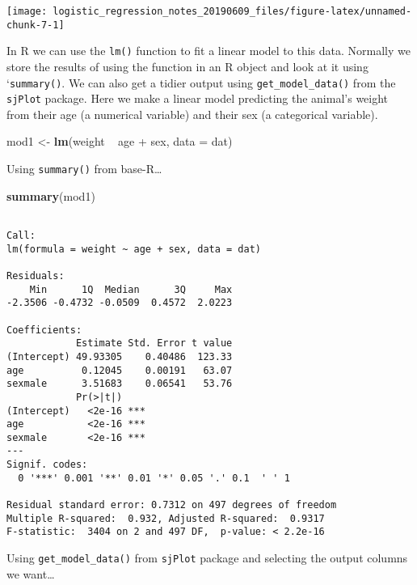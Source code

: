 \documentclass[]{tufte-handout}
\newenvironment{Shaded}{}{}
\newcommand{\DataTypeTok}[1]{\textcolor[rgb]{0.56,0.13,0.00}{#1}}
\newcommand{\KeywordTok}[1]{\textcolor[rgb]{0.00,0.44,0.13}{\textbf{#1}}}
\newcommand{\NormalTok}[1]{#1}
\newcommand{\OperatorTok}[1]{\textcolor[rgb]{0.40,0.40,0.40}{#1}}
\newcommand{\StringTok}[1]{\textcolor[rgb]{0.25,0.44,0.63}{#1}}
\begin{document}
\texttt{[image: logistic\_regression\_notes\_20190609\_files/figure-latex/unnamed-chunk-7-1]}

In R we can use the \texttt{lm()} function to fit a linear model to this
data. Normally we store the results of using the function in an R object
and look at it using `\texttt{summary()}. We can also get a tidier
output using \texttt{get\_model\_data()} from the \texttt{sjPlot}
package. Here we make a linear model predicting the animal's weight from
their age (a numerical variable) and their sex (a categorical variable).

\begin{Shaded}
\begin{Highlighting}[]
\NormalTok{mod1 <-}\StringTok{ }\KeywordTok{lm}\NormalTok{(weight }\OperatorTok{~}\StringTok{ }\NormalTok{age }\OperatorTok{+}\StringTok{ }\NormalTok{sex, }\DataTypeTok{data =}\NormalTok{ dat)}
\end{Highlighting}
\end{Shaded}

Using \texttt{summary()} from base-R\ldots{}

\begin{Shaded}
\begin{Highlighting}[]
\KeywordTok{summary}\NormalTok{(mod1)}
\end{Highlighting}
\end{Shaded}

\begin{verbatim}

Call:
lm(formula = weight ~ age + sex, data = dat)

Residuals:
    Min      1Q  Median      3Q     Max 
-2.3506 -0.4732 -0.0509  0.4572  2.0223 

Coefficients:
            Estimate Std. Error t value
(Intercept) 49.93305    0.40486  123.33
age          0.12045    0.00191   63.07
sexmale      3.51683    0.06541   53.76
            Pr(>|t|)    
(Intercept)   <2e-16 ***
age           <2e-16 ***
sexmale       <2e-16 ***
---
Signif. codes:  
  0 '***' 0.001 '**' 0.01 '*' 0.05 '.' 0.1  ' ' 1

Residual standard error: 0.7312 on 497 degrees of freedom
Multiple R-squared:  0.932, Adjusted R-squared:  0.9317 
F-statistic:  3404 on 2 and 497 DF,  p-value: < 2.2e-16
\end{verbatim}

Using \texttt{get\_model\_data()} from \texttt{sjPlot} package and
selecting the output columns we want\ldots{}

\begin{Shaded}
\end{Shaded}
\end{document}
